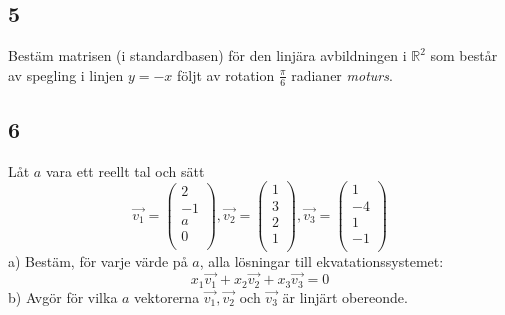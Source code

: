 \documentclass{article}
\begin{document}
\subsection*{5}
Bestäm matrisen (i standardbasen) för den linjära avbildningen i $\mathbb{R}^2$ 
som består av spegling i linjen $y=-x$ följt av rotation $\frac{\pi}{6}$ radianer 
{\it moturs}.

\subsection*{6}
Låt $a$ vara ett reellt tal och sätt
$$
\vec{v_{1}} = 
\begin{pmatrix}
    2 \\
    -1 \\
    a \\
    0 \\
\end{pmatrix}
,
\vec{v_{2}} = 
\begin{pmatrix}
    1 \\
    3 \\
    2 \\
    1 \\
\end{pmatrix}
,
\vec{v_{3}} = 
\begin{pmatrix}
    1 \\
    -4 \\
    1 \\
    -1 \\
\end{pmatrix}
$$
\noindent
a) Bestäm, för varje värde på $a$, alla lösningar till ekvatationssystemet:
$$ x_{1} \vec{v_{1}} + x_{2} \vec{v_{2}} + x_{3} \vec{v_{3}} = 0 $$
b) Avgör för vilka $a$ vektorerna $\vec{v_{1}}, \vec{v_{2}}$ och $\vec{v_{3}}$ 
är linjärt obereonde.
\end{document}
